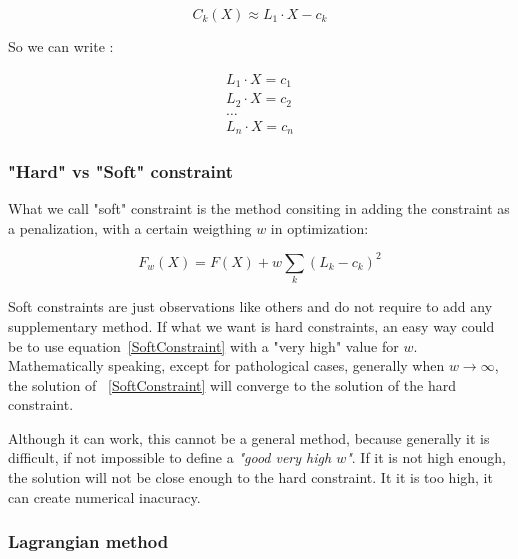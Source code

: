 \begin{equation} 
C_k(X) \approx L_1 \cdot X  - c_k
\end{equation} 

So we can write :

\begin{equation} 
\begin{split}
  L_1 \cdot X = c_1 \\
  L_2 \cdot X = c_2 \\
    \dots \\
  L_n \cdot X = c_n 
\end{split}
\end{equation}


\subsubsection{"Hard" vs "Soft" constraint}

What we call "soft" constraint is the method consiting in adding
the constraint as a penalization, with a certain weigthing $w$  in optimization:

\begin{equation}
    F_w(X) = F(X) + w  \sum_k (L_k-c_k)^2 \label{SoftConstraint}
\end{equation}

Soft constraints are just observations like others and do not require
to add any supplementary method. If what we want is hard constraints, an
easy way could be to use equation~\ref{SoftConstraint} with a "very high"
value for $w$.   Mathematically speaking, except for pathological cases,
generally when $w \rightarrow \infty$, the solution of ~\ref{SoftConstraint}
will converge to the solution of the hard constraint.

Although it can work, this cannot be a general method, because generally
it is difficult, if not impossible to define a \emph{"good very high $w$"}.
If it is not high enough, the solution will not be close enough to the hard
constraint.  It it is too high, it can create numerical inacuracy.


\subsubsection{Lagrangian method}

